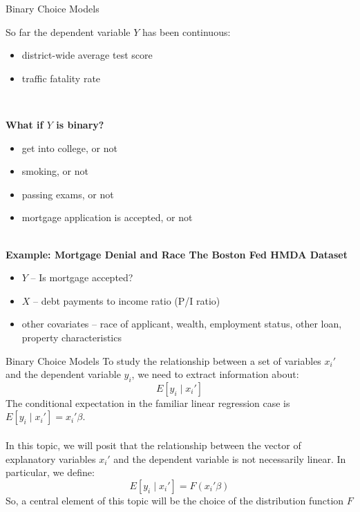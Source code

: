 \documentclass[notes,10pt, aspectratio=169]{beamer}
\begin{document}
\begin{frame}{Binary Choice Models}

So far the dependent variable $Y$ has been continuous:
\begin{itemize}
    \item district-wide average test score
    \item traffic fatality rate
\end{itemize}\\[1em]
\begin{center}
    {\color{purple}\textbf{What if $Y$ is binary?}}
\end{center}
\begin{itemize}
    \item get into college, or not
    \item smoking, or not
    \item passing exams, or not
    \item mortgage application is accepted, or not
\end{itemize}\\[1em]
\textbf{Example: Mortgage Denial and Race The Boston Fed HMDA Dataset}
\begin{itemize}
    \item $Y$ -- Is mortgage accepted?
    \item $X$ -- debt payments to income ratio (P/I ratio)
    \item other covariates -- race of applicant, wealth, employment status, other loan, property characteristics

\end{itemize}

\end{frame}


\begin{frame}{Binary Choice Models}
To study the relationship between a set of variables $x_i'$ and the dependent variable $y_i$, we need to extract information about:
\[
E[y_i \mid x_i']
\]
The conditional expectation in the familiar linear regression case is $E[y_i \mid x_i']=x_i'\beta$. \\~\\
In this topic, we will posit that the relationship between the vector of explanatory variables $x_i'$ and the dependent variable is not necessarily linear. In particular, we define:
\[
E[y_i \mid x_i']=F(x_i'\beta)
\]
So, a central element of this topic will be the choice of the distribution function $F$
\end{frame}
\end{document}
